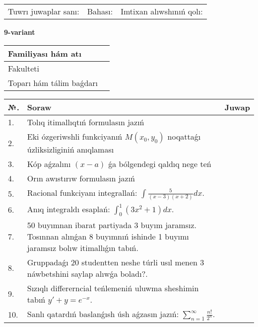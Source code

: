 \documentclass{article}
\begin{document}
\vspace{1cm}

\begin{tabular}{ c c c }
Tuwrı juwaplar sanı: \underline{\hspace{2cm}} & Bahası: \underline{\hspace{2cm}} & Imtixan alıwshınıń qolı: \underline{\hspace{2cm}} \\
\end{tabular}

\newpage

\begin{center}\textbf{9-variant}\end{center}

\bgroup
\def\arraystretch{1.5}
\begin{tabular}{ |m{6cm}|m{10cm}| }
  \hline
  Familiyası hám atı & \\
  \hline
  Fakulteti &\\
  \hline
  Toparı hám tálim baǵdarı & \\
  \hline
\end{tabular}
\egroup

\vspace{0.5cm}

\bgroup
\def\arraystretch{2}
\begin{tabular}{ |l|m{8cm}|m{7cm}| }
  \hline
  №. & Soraw & Juwap \\
  \hline
  1. & Tolıq itimallıqtıń formulasın jazıń &  \\
  \hline
  2. & Eki ózgeriwshli funkciyanıń $M(x_{0} , y_{0})$ noqattaǵı úzliksizliginiń anıqlaması &  \\
  \hline
  3. & Kóp aǵzalını $(x - a)$ ǵa bólgendegi qaldıq nege teń &  \\
  \hline
  4. & Orın awıstırıw formulasın jazıń &  \\
  \hline
  5. & Racional funkciyanı integrallań: $\displaystyle\int {\frac{5}{(x - 3)(x + 2)}dx}$. &  \\
  \hline
  6. & Anıq integraldı esaplań: $\displaystyle\int_{0}^{1}{(3x^{2} + 1)dx}$. &  \\
  \hline
  7. & 50 buyımnan ibarat partiyada 3 buyım jaramsız. Tosınnan alınǵan 8 buyımnıń ishinde 1 buyımı jaramsız bolıw itimallıǵın tabıń. &  \\
  \hline
  8. & Gruppadaǵı 20 studentten neshe túrli usıl menen 3 náwbetshini saylap alıwǵa boladı?. &  \\
  \hline
  9. & Sızıqlı differerncial teńlemeniń uluwma sheshimin tabıń $y' + y =e^{-x}$. &  \\
  \hline
  10. & Sanlı qatardıń baslanǵısh úsh aǵzasın jazıń: $\displaystyle\sum_{n = 1}^{\infty}\frac{n!}{2^{n}}$. &  \\
  \hline
\end{tabular}
\egroup
\end{document}
